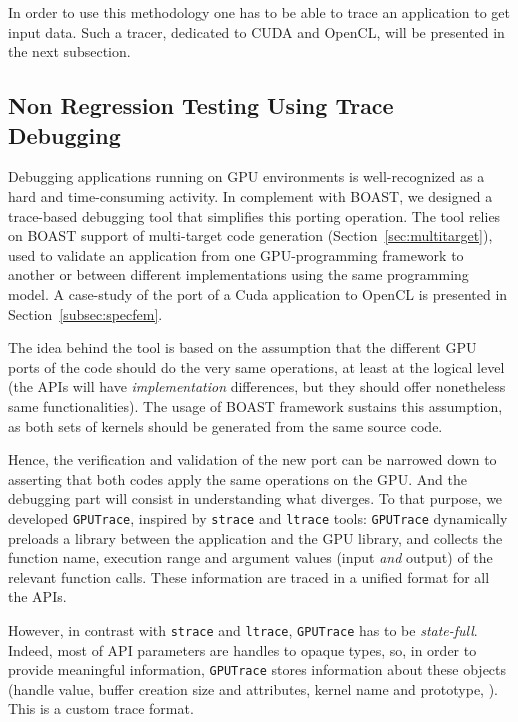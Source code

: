 \documentclass[11pt, a4paper, twoside]{montblanc}
\newcommand{\code}[1]{\texttt{#1}}
\begin{document}
In order to use this methodology one has to be able to trace an application to
get input data. Such a tracer, dedicated to CUDA and OpenCL, will be presented
in the next subsection.

\subsection{Non Regression Testing Using Trace Debugging}
\label{sec:gputrace}

Debugging applications running on GPU environments is well-recognized as a hard
and time-consuming activity. In complement with BOAST, we designed a trace-based
debugging tool that simplifies this porting operation. The tool relies on BOAST
support of multi-target code generation (Section~\ref{sec:multitarget}), used to
validate an application from one GPU-programming framework to another or between
different implementations using the same programming model. A case-study of the
port of a Cuda application to OpenCL is presented in
Section~\ref{subsec:specfem}.

The idea behind the tool is based on the assumption that the different GPU
ports of the code should do the very same operations, at least at the logical
level (the APIs will have \emph{implementation} differences, but they should
offer nonetheless same functionalities). The usage of BOAST framework sustains
this assumption, as both sets of kernels should be generated from the same
source code.

Hence, the verification and validation of the new port can be
narrowed down to asserting that both codes apply the same operations
on the GPU. And the debugging part will consist in understanding what
diverges. To that purpose, we developed \code{GPUTrace}, inspired by
\code{strace} and \code{ltrace} tools: \code{GPUTrace} dynamically
preloads a library between the application and the GPU library, and
collects the function name, execution range and argument values (input
\emph{and} output) of the relevant function calls. These information
are traced in a unified format for all the APIs.

However, in contrast with \code{strace} and \code{ltrace},
\code{GPUTrace} has to be \emph{state-full}. Indeed, most of API
parameters are handles to opaque types, so, in order to provide
meaningful information, \code{GPUTrace} stores information about these
objects (handle value, buffer creation size and attributes, kernel
name and prototype, \etc{}). This is a custom trace format.
\end{document}
